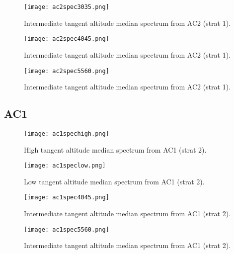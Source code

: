 \begin{figure}[!t]
\centering
\texttt{[image: ac2spec3035.png]}\\
\caption{Intermediate tangent altitude median spectrum from AC2 (strat 1).}
\label{fig:study2spec5}
\end{figure}

\begin{figure}[!t]
\centering
\texttt{[image: ac2spec4045.png]}\\
\caption{Intermediate tangent altitude median spectrum from AC2 (strat 1).}
\label{fig:study2spec6}
\end{figure}

\begin{figure}[!t]
\centering
\texttt{[image: ac2spec5560.png]}\\
\caption{Intermediate tangent altitude median spectrum from AC2 (strat 1).}
\label{fig:study2spec7}
\end{figure}
\clearpage
\newpage
\subsection{AC1}
\begin{figure}[!t]
\centering
\texttt{[image: ac1spechigh.png]}\\
\caption{High tangent altitude median spectrum from AC1 (strat 2).}
\label{fig:study2spec8}
\end{figure}

\begin{figure}[!t]
\centering
\texttt{[image: ac1speclow.png]}\\
\caption{Low tangent altitude median spectrum from AC1 (strat 2).}
\label{fig:study2spec9}
\end{figure}



\begin{figure}[!t]
\centering
\texttt{[image: ac1spec4045.png]}\\
\caption{Intermediate tangent altitude median spectrum from AC1 (strat 2).}
\label{fig:spec1}
\end{figure}

\begin{figure}[!t]
\centering
\texttt{[image: ac1spec5560.png]}\\
\caption{Intermediate tangent altitude median spectrum from AC1 (strat 2).}
\label{fig:spec1}
\end{figure}





